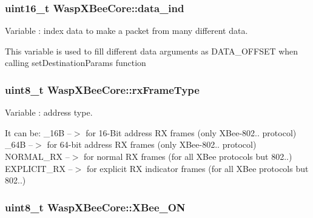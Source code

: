 \subsubsection[{\texorpdfstring{data\+\_\+ind}{data_ind}}]{\setlength{\rightskip}{0pt plus 5cm}uint16\+\_\+t Wasp\+X\+Bee\+Core\+::data\+\_\+ind\hspace{0.3cm}{\ttfamily [protected]}}\hypertarget{class_wasp_x_bee_core_af038fd4c9b17ccccca68e19ddcd5680f}{}\label{class_wasp_x_bee_core_af038fd4c9b17ccccca68e19ddcd5680f}


Variable \+: index data to make a packet from many different data. 

This variable is used to fill different data arguments as D\+A\+T\+A\+\_\+\+O\+F\+F\+S\+ET when calling set\+Destination\+Params function 
\subsubsection[{\texorpdfstring{rx\+Frame\+Type}{rxFrameType}}]{\setlength{\rightskip}{0pt plus 5cm}uint8\+\_\+t Wasp\+X\+Bee\+Core\+::rx\+Frame\+Type\hspace{0.3cm}{\ttfamily [protected]}}\hypertarget{class_wasp_x_bee_core_afaf2c3a20d481aad0696152cd8a63ad2}{}\label{class_wasp_x_bee_core_afaf2c3a20d481aad0696152cd8a63ad2}


Variable \+: address type. 

It can be\+: \+\_\+16B --$>$ for 16-\/\+Bit address RX frames (only X\+Bee-\/802.. protocol) \+\_\+64B --$>$ for 64-\/bit address RX frames (only X\+Bee-\/802.. protocol) N\+O\+R\+M\+A\+L\+\_\+\+RX --$>$ for normal RX frames (for all X\+Bee protocols but 802..) E\+X\+P\+L\+I\+C\+I\+T\+\_\+\+RX --$>$ for explicit RX indicator frames (for all X\+Bee protocols but 802..) 
\subsubsection[{\texorpdfstring{X\+Bee\+\_\+\+ON}{XBee_ON}}]{\setlength{\rightskip}{0pt plus 5cm}uint8\+\_\+t Wasp\+X\+Bee\+Core\+::\+X\+Bee\+\_\+\+ON}\hypertarget{class_wasp_x_bee_core_a36a70db11a542cd76745ab7dfbaafff1}{}\label{class_wasp_x_bee_core_a36a70db11a542cd76745ab7dfbaafff1}



